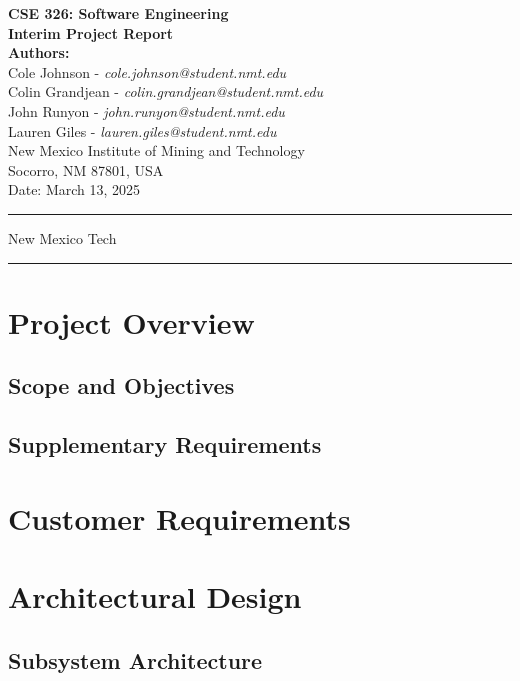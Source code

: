 \documentclass[english,12pt]{article}
\begin{document}
\begin{titlepage}
    \null
    \vspace*{2cm}
    
    \begin{center}
        {\Huge \bfseries CSE 326: Software Engineering}\\[1.5cm]
        {\Large \bfseries Interim Project Report}\\[2cm]
        
        \textbf{Authors:} \\[0.5cm]
        Cole Johnson - \textit{cole.johnson@student.nmt.edu}\\
        Colin Grandjean - \textit{colin.grandjean@student.nmt.edu}\\
        John Runyon - \textit{john.runyon@student.nmt.edu}\\
        Lauren Giles - \textit{lauren.giles@student.nmt.edu}\\[1cm]
        
        New Mexico Institute of Mining and Technology\\
        Socorro, NM 87801, USA\\[2cm]
        
        {\large Date: March 13, 2025}
    \end{center}
    
    \vfill
    \hrule
    \smallskip
    \centerline{\sc New Mexico Tech}
    \smallskip
    \hrule
\end{titlepage}
{\tableofcontents} 
\pagebreak
\section{Project Overview}
\subsection{Scope and Objectives}
\subsection{Supplementary Requirements}
\section{Customer Requirements}
\section{Architectural Design}
\subsection{Subsystem Architecture}
\end{document}
